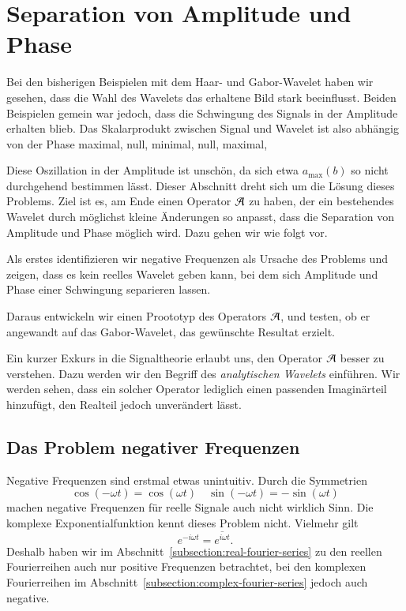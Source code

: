 \section{Separation von Amplitude und Phase}
\label{complex:separate}

Bei den bisherigen Beispielen mit dem Haar- und Gabor-Wavelet haben wir gesehen, dass die Wahl des Wavelets das erhaltene Bild stark beeinflusst.
Beiden Beispielen gemein war jedoch, dass die Schwingung des Signals in der Amplitude erhalten blieb.
Das Skalarprodukt zwischen Signal und Wavelet ist also abhängig von der Phase maximal, null, minimal, null, maximal, \textellipsis

Diese Oszillation in der Amplitude ist unschön, da sich etwa $a_\text{max}(b)$ so nicht durchgehend bestimmen lässt.
Dieser Abschnitt dreht sich um die Lösung dieses Problems.
Ziel ist es, am Ende einen Operator $\Ana\,$ zu haben, der ein bestehendes Wavelet durch möglichst kleine Änderungen so anpasst, dass die Separation von Amplitude und Phase möglich wird.
Dazu gehen wir wie folgt vor.

Als erstes identifizieren wir negative Frequenzen als Ursache des Problems und zeigen, dass es kein reelles Wavelet geben kann, bei dem sich Amplitude und Phase einer Schwingung separieren lassen.

Daraus entwickeln wir einen Proototyp des Operators $\Ana\,$, und testen, ob er angewandt auf das Gabor-Wavelet, das gewünschte Resultat erzielt.

Ein kurzer Exkurs in die Signaltheorie erlaubt uns, den Operator $\Ana\,$ besser zu verstehen. 
Dazu werden wir den Begriff des \emph{analytischen Wavelets} einführen.
Wir werden sehen, dass ein solcher Operator lediglich einen passenden Imaginärteil hinzufügt, den Realteil jedoch unverändert lässt.

\subsection{Das Problem negativer Frequenzen}
Negative Frequenzen sind erstmal etwas unintuitiv.
Durch die Symmetrien
\[
	\cos(-\omega t) = \cos(\omega t)
	\quad
	\sin(-\omega t) = -\sin(\omega t)
\]
machen negative Frequenzen für reelle Signale auch nicht wirklich Sinn.
Die komplexe Exponential\-funktion kennt dieses Problem nicht.
Vielmehr gilt
\begin{equation}
	e^{-i\omega t} = \overline{e^{i\omega t}}.\label{complex:exp-inv-conj}
\end{equation}
Deshalb haben wir im Abschnitt~\ref{subsection:real-fourier-series} zu den reellen Fourierreihen auch nur positive Frequenzen betrachtet,
bei den komplexen Fourierreihen im Abschnitt~\ref{subsection:complex-fourier-series} jedoch auch negative.

